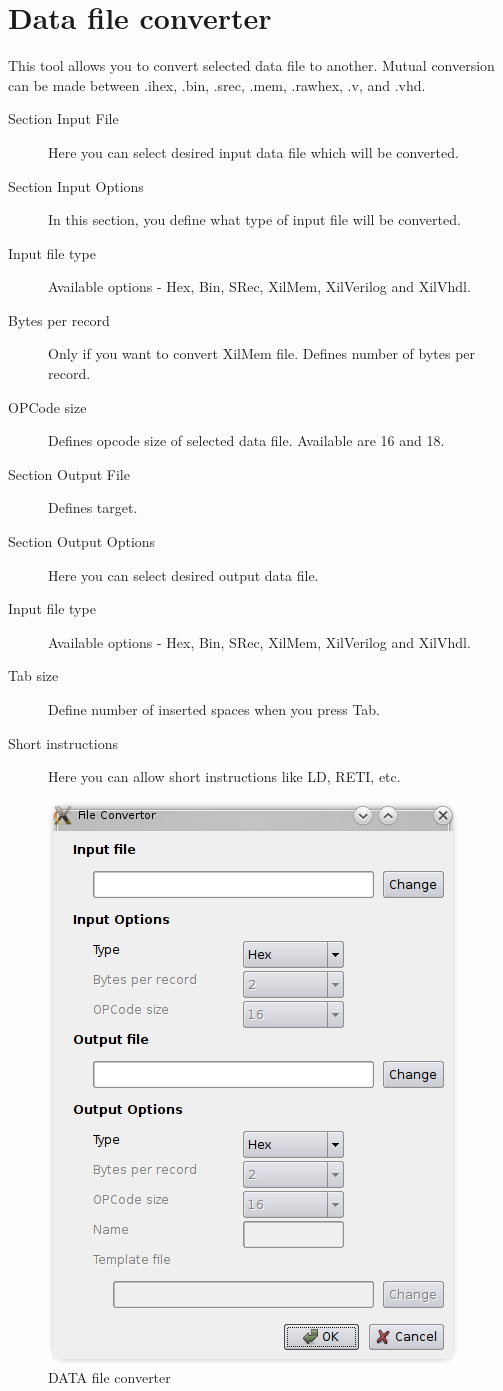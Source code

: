 \section{Data file converter}
    This tool allows you to convert selected data file to another. Mutual conversion can be made between .ihex, .bin,
    .srec, .mem, .rawhex, .v, and .vhd.
    \begin{description}
        \item[Section Input File] Here you can select desired input data file which will be converted.
        \item[Section Input Options] In this section, you define what type of input file will be converted.
        \item[Input file type] Available options - Hex, Bin, SRec, XilMem, XilVerilog and XilVhdl.
        \item[Bytes per record] Only if you want to convert XilMem file. Defines number of bytes per record.
        \item[OPCode size] Defines opcode size of selected data file. Available are 16 and 18.
        \item[Section Output File] Defines target.
        \item[Section Output Options] Here you can select desired output data file.
        \item[Input file type] Available options - Hex, Bin, SRec, XilMem, XilVerilog and XilVhdl.
        \item[Tab size]  Define number of inserted spaces when you press Tab.
        \item[Short instructions] Here you can allow short instructions like LD, RETI, etc.
    \end{description}

    \begin{figure}[h]
        \centering{}
        \includegraphics[width=.5\textwidth]{img/DATA_converter.png}
        \caption{DATA file converter}
    \end{figure}

